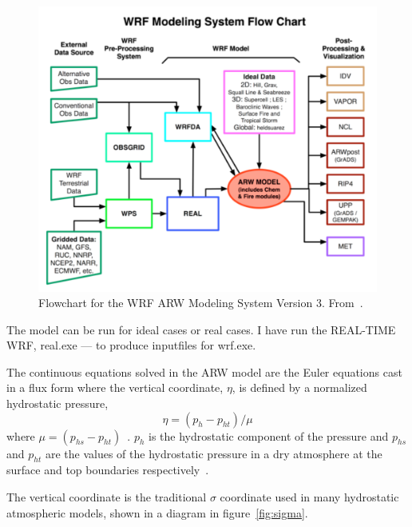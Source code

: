 \begin{figure}
\centering
\includegraphics[width=\textwidth]{model_methods/wrfflowchart}
\caption{Flowchart for the WRF ARW Modeling System Version 3. From~\citet{Wang2015}.}
\label{fig:wrfflowchart}
\end{figure}

The model can be run for ideal cases or real cases. I have run the REAL-TIME WRF, real.exe — to produce inputfiles for wrf.exe.

The continuous equations solved in the ARW model are the Euler equations cast in a flux form where the vertical coordinate, $\eta$, is defined by a normalized hydrostatic pressure,
\begin{equation}
\eta = (p_h - p_{ht})/\mu 
\end{equation}
where $\mu = (p_{hs} - p_{ht})$~\citep{Skamarock2008}. $p_h$ is the hydrostatic component of the pressure and $p_{hs}$ and $p_{ht}$ are the values of the hydrostatic pressure in a dry atmosphere at the surface and top boundaries respectively~\citep{Skamarock2008}.

The vertical coordinate is the traditional $\sigma$ coordinate used in many hydrostatic atmospheric models, shown in a diagram in figure~\ref{fig:sigma}.

